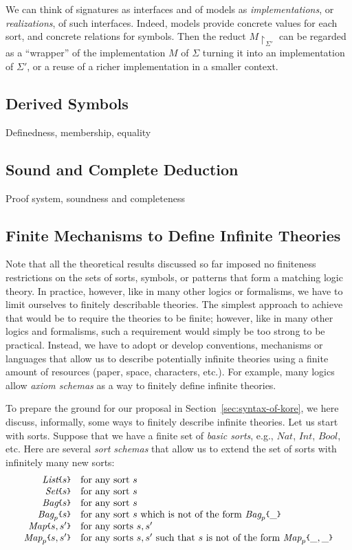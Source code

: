 \documentclass[UTF8,11pt]{article}
\theoremstyle{plain}
\theoremstyle{definition}
\theoremstyle{remark}
\newcommand{\Nat}{\textit{Nat}}
\newcommand{\Int}{\textit{Int}}
\newcommand{\Bool}{\textit{Bool}}
\newcommand{\List}{\textit{List}}
\newcommand{\Bag}{\textit{Bag}}
\newcommand{\Set}{\textit{Set}}
\newcommand{\Map}{\textit{Map}}
\newcommand{\parametric}[2]{{#1}\raisebox{.2ex}{\texttt{\footnotesize{\{}}}#2\raisebox{.2ex}{\texttt{\footnotesize{\}}}}}
\newcommand{\reduct}[2]{\mbox{${#1}\!\!\upharpoonright_{#2}$}}
\begin{document}
We can think of signatures as interfaces and of models as
\emph{implementations}, or \emph{realizations}, of such interfaces.
Indeed, models provide concrete values for each sort, and concrete relations
for symbols.
Then the reduct $\reduct{M}{\Sigma'}$ can be regarded as a ``wrapper'' of
the implementation $M$ of $\Sigma$ turning it into an implementation of
$\Sigma'$, or a reuse of a richer implementation in a smaller context.

\subsection{Derived Symbols}

Definedness, membership, equality

\subsection{Sound and Complete Deduction}

Proof system, soundness and completeness

\subsection{Finite Mechanisms to Define Infinite Theories}

Note that all the theoretical results discussed so far imposed no finiteness
restrictions on the sets of sorts, symbols, or patterns that form a matching
logic theory.
In practice, however, like in many other logics or formalisms, we have to
limit ourselves to finitely describable theories.
The simplest approach to achieve that would be to require the theories to be
finite; however, like in many other logics and formalisms, such a requirement
would simply be too strong to be practical.
Instead, we have to adopt or develop conventions, mechanisms or languages that
allow us to describe potentially infinite theories using a finite amount of
resources (paper, space, characters, etc.).
For example, many logics allow \emph{axiom schemas} as a way to finitely
define infinite theories.

To prepare the ground for our proposal in Section~\ref{sec:syntax-of-kore},
we here discuss, informally, some ways to finitely describe infinite theories.
Let us start with sorts.
Suppose that we have a finite set of \emph{basic sorts}, e.g.,
$\Nat$, $\Int$, $\Bool$, etc.
Here are several \emph{sort schemas} that allow us to extend the set of sorts
with infinitely many new sorts:
$$
\begin{array}{rl}
\parametric{\List}{s} &
\textrm{for any sort $s$} \\
\parametric{\Set}{s} &
\textrm{for any sort $s$} \\
\parametric{\Bag}{s} &
\textrm{for any sort $s$} \\
\parametric{\Bag_p}{s} &
\textrm{for any sort $s$ which is not of the form $\parametric{\Bag_p}{\_}$} \\
\parametric{\Map}{s,s'} &
\textrm{for any sorts $s,s'$} \\
\parametric{\Map_p}{s,s'} &
\textrm{for any sorts $s,s'$ such that $s$ is not of the form $\parametric{\Map_p}{\_,\_}$}
\end{array}
$$
\end{document}
